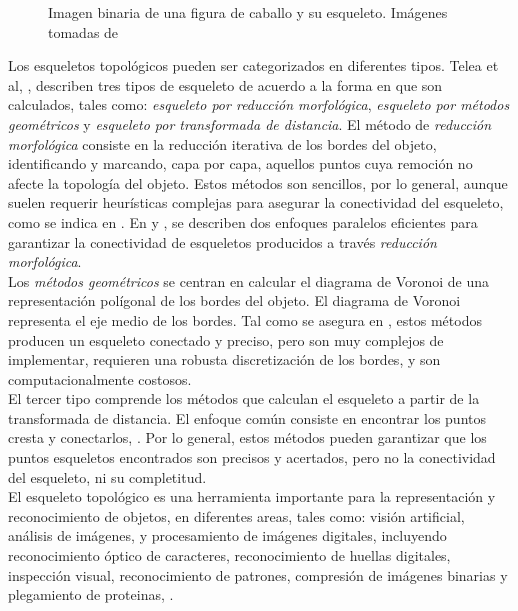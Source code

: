 \begin{figure}[h t b p ! H]
  \centering
\qquad
  \caption[Imagen binaria y esqueleto topol\'ogico de una figura de caballo]{Imagen binaria de una figura de
caballo y su esqueleto. Im\'agenes tomadas de \cite{ssm}}
  \label{fig:genskeleton}
\end{figure}


Los esqueletos topol\'ogicos pueden ser categorizados en diferentes tipos.
Telea et al, \cite{augmented}, describen tres tipos de esqueleto de acuerdo a la forma en que
son calculados, tales como: \emph{esqueleto por reducci\'on morfol\'ogica}, 
\emph{esqueleto por m\'etodos geom\'etricos} y \emph{esqueleto por transformada de distancia}.
El m\'etodo de \emph{reducci\'on morfol\'ogica} consiste en la reducci\'on iterativa de los bordes
del objeto, identificando y marcando, capa por capa, aquellos puntos cuya remoci\'on no afecte
la topolog\'ia del objeto. Estos m\'etodos son sencillos, por lo general, aunque suelen requerir
heur\'isticas complejas para asegurar la conectividad del esqueleto, como se indica en
\cite{augmented}. En \cite{onepass} y \cite{thinning}, se describen dos enfoques paralelos
eficientes para garantizar la conectividad de esqueletos producidos a trav\'es 
\emph{reducci\'on morfol\'ogica}.\\
Los \emph{m\'etodos geom\'etricos} se centran en calcular el diagrama de Voronoi de una
representaci\'on pol\'igonal de los bordes del objeto. El diagrama de Voronoi representa
el eje medio de los bordes. Tal como se asegura en \cite[p.251]{augmented}, estos m\'etodos
producen un esqueleto conectado y preciso, pero son muy complejos de implementar, requieren
una robusta discretizaci\'on de los bordes, y son computacionalmente costosos.\\
El tercer tipo comprende los m\'etodos que calculan el esqueleto a partir de 
la transformada de distancia. El enfoque com\'un consiste en encontrar los puntos cresta
y conectarlos, \cite{maxima, euclideancentre, ridgedt}. Por lo general, estos m\'etodos
pueden garantizar que los puntos esqueletos encontrados son precisos y acertados, 
pero no la conectividad del esqueleto, ni su completitud.\\

El esqueleto topol\'ogico es una herramienta importante para la representaci\'on
y reconocimiento de objetos, en diferentes areas, tales como: visi\'on artificial,
an\'alisis de im\'agenes, y procesamiento de im\'agenes digitales, incluyendo 
reconocimiento \'optico de caracteres, reconocimiento de huellas digitales, inspecci\'on
visual, reconocimiento de patrones, compresi\'on de im\'agenes binarias y plegamiento
de proteinas, \cite{skprotein}.


